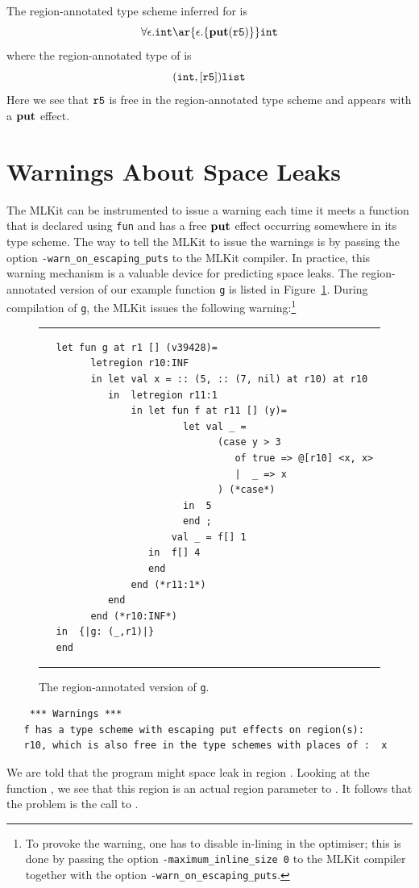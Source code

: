 \documentclass[12pt]{book}
\begin{document}
The region-annotated type scheme inferred for  is
$$\forall\epsilon.\boxml{int} \ar{\epsilon.\{\Put(\mathtt{r5})\}} \boxml{int}$$
where the region-annotated type of  is
$$(\hbox{\tt int},[\hbox{\tt r5}])\hbox{\tt list}$$
Here we see that
$\hbox{\tt r5}$ is free in the region-annotated type scheme and appears
with a $\mathop{\bf put}\nolimits$ effect.

\section{Warnings About Space Leaks}
The MLKit can be instrumented to issue a warning each time it meets a
function that is declared using {\tt fun} and has a free $\mathop{\bf put}\nolimits$ effect
occurring somewhere in its type scheme. The way to tell the MLKit to
issue the warnings is by passing the option
%
\texttt{-warn\_on\_escaping\_puts} to the MLKit compiler. In practice, this warning
mechanism is a valuable device for predicting space leaks.  The
region-annotated version of our example function {\tt g} is listed in
Figure~\ref{escape_mulexp.fig}. During compilation of {\tt g}, the MLKit
issues the following warning:\footnote{To provoke the warning, one has
  to disable in-lining in the
  {\Lam} optimiser; this is done by passing the option
  \texttt{-maximum\_inline\_size 0} to the MLKit compiler together
  with the option \texttt{-warn\_on\_escaping\_puts}.}
\begin{figure}
\hrule
\medskip
\begin{verbatim}
   let fun g at r1 [] (v39428)= 
         letregion r10:INF 
         in let val x = :: (5, :: (7, nil) at r10) at r10
            in  letregion r11:1 
                in let fun f at r11 [] (y)= 
                         let val _ = 
                               (case y > 3 
                                  of true => @[r10] <x, x>
                                  |  _ => x
                               ) (*case*) 
                         in  5
                         end ; 
                       val _ = f[] 1
                   in  f[] 4
                   end  
                end (*r11:1*)
            end  
         end (*r10:INF*)
   in  {|g: (_,r1)|}
   end 
\end{verbatim}
\caption{The region-annotated version of {\tt g}.}
\medskip
\hrule
\label{escape_mulexp.fig}
\end{figure}
\begin{small}
\begin{verbatim}
    *** Warnings ***
   f has a type scheme with escaping put effects on region(s): 
   r10, which is also free in the type schemes with places of :  x
\end{verbatim}
\end{small}
We are told that the program might space leak in region .
Looking at the function , we see that this region is an
actual region parameter to . It follows that the problem is
the call to .
\end{document}
